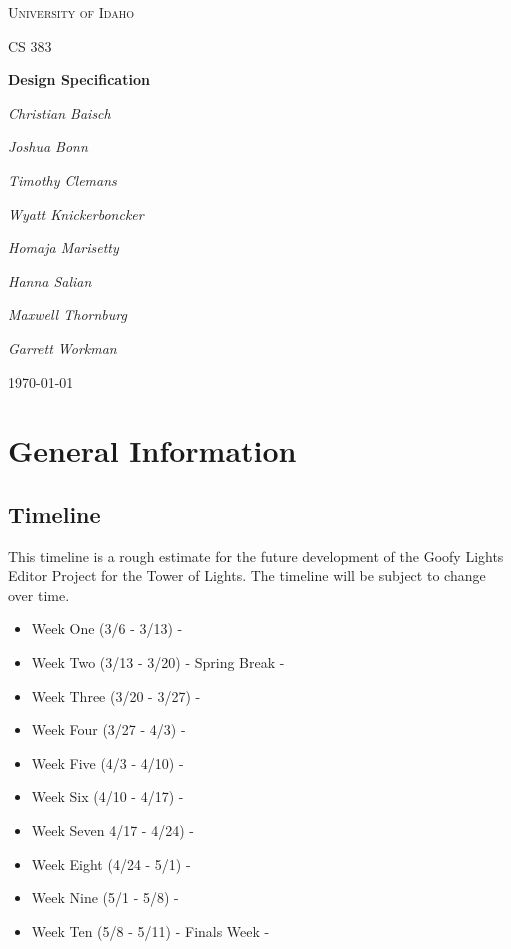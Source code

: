 \documentclass[12pt, oneside]{article}
\begin{document}
\begin{titlepage}
\centering
	{\scshape\LARGE University of Idaho \par}
	\vspace{1cm}
	{\scshape\Large CS 383\par}
	\vspace{1.5cm}
	{\huge\bfseries Design Specification\par}
	\vspace{2cm}
	{\Large\itshape Christian Baisch\par}
	{\Large\itshape Joshua Bonn\par}
	{\Large\itshape Timothy Clemans\par}
	{\Large\itshape Wyatt Knickerboncker\par}
	{\Large\itshape Homaja Marisetty\par}
	{\Large\itshape Hanna Salian\par}
	{\Large\itshape Maxwell Thornburg\par}
	{\Large\itshape Garrett Workman\par}
	\vfill
	{\large \today\par}
\end{titlepage}

\section{General Information}

\subsection{Timeline}

This timeline is a rough estimate for the future development of the Goofy Lights Editor Project for the Tower of Lights. 
The timeline will be subject to change over time.

\begin{itemize}
\item
Week One (3/6 - 3/13) - 
\item
Week Two (3/13 - 3/20) - Spring Break - 
\item
Week Three (3/20 - 3/27) -  
\item
Week Four (3/27 - 4/3) -
\item
Week Five (4/3 - 4/10) -
\item
Week Six (4/10 - 4/17) -
\item
Week Seven 4/17 - 4/24) -
\item
Week Eight (4/24 - 5/1) - 
\item
Week Nine (5/1 - 5/8) - 
\item
Week Ten  (5/8 - 5/11) - Finals Week - 


\end{itemize}
\end{document}
